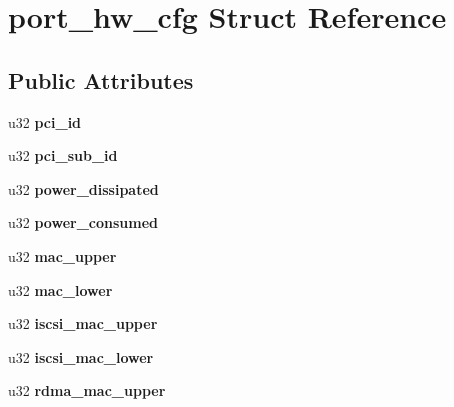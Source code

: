 \hypertarget{structport__hw__cfg}{
\section{port\_\-hw\_\-cfg Struct Reference}
\label{structport__hw__cfg}
}
\subsection*{Public Attributes}
\begin{DoxyCompactItemize}
\item 
\hypertarget{structport__hw__cfg_aa571cf285cc15a2569b60e5877cf87ae}{
u32 {\bfseries pci\_\-id}}
\label{structport__hw__cfg_aa571cf285cc15a2569b60e5877cf87ae}

\item 
\hypertarget{structport__hw__cfg_a5e4a87e683bd6ffdf940e02f46dae23e}{
u32 {\bfseries pci\_\-sub\_\-id}}
\label{structport__hw__cfg_a5e4a87e683bd6ffdf940e02f46dae23e}

\item 
\hypertarget{structport__hw__cfg_aa0c5a94f936c0f65edb8673caa19e40e}{
u32 {\bfseries power\_\-dissipated}}
\label{structport__hw__cfg_aa0c5a94f936c0f65edb8673caa19e40e}

\item 
\hypertarget{structport__hw__cfg_a5bf28d5ebd081036b257a6a3cfd3b356}{
u32 {\bfseries power\_\-consumed}}
\label{structport__hw__cfg_a5bf28d5ebd081036b257a6a3cfd3b356}

\item 
\hypertarget{structport__hw__cfg_adcf38bdcf856f174fa60e415c34ce164}{
u32 {\bfseries mac\_\-upper}}
\label{structport__hw__cfg_adcf38bdcf856f174fa60e415c34ce164}

\item 
\hypertarget{structport__hw__cfg_a239c8d800d695b33f7c2821365c33d3e}{
u32 {\bfseries mac\_\-lower}}
\label{structport__hw__cfg_a239c8d800d695b33f7c2821365c33d3e}

\item 
\hypertarget{structport__hw__cfg_a6fdea858a4e13494fc843596d1049d09}{
u32 {\bfseries iscsi\_\-mac\_\-upper}}
\label{structport__hw__cfg_a6fdea858a4e13494fc843596d1049d09}

\item 
\hypertarget{structport__hw__cfg_a1ef5a77364f8b2bf74d0f1a0528d098b}{
u32 {\bfseries iscsi\_\-mac\_\-lower}}
\label{structport__hw__cfg_a1ef5a77364f8b2bf74d0f1a0528d098b}

\item 
\hypertarget{structport__hw__cfg_a1a3b717a29494777add4b92e6bc37d56}{
u32 {\bfseries rdma\_\-mac\_\-upper}}
\label{structport__hw__cfg_a1a3b717a29494777add4b92e6bc37d56}


\end{DoxyCompactItemize}
